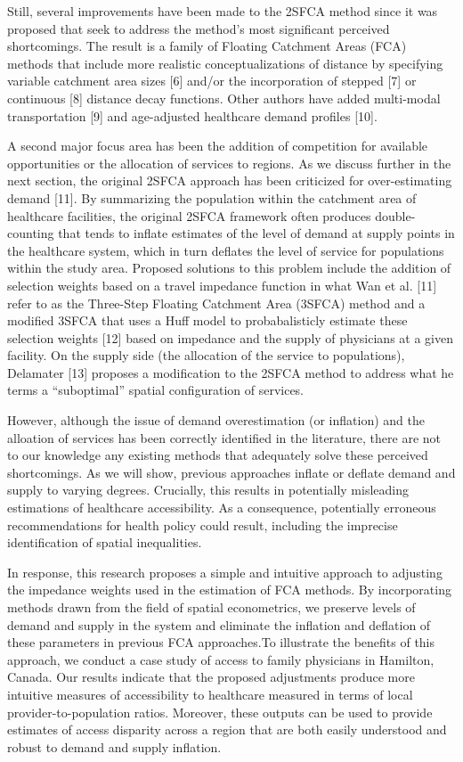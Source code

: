 \documentclass[10pt,letterpaper]{article}
\begin{document}
Still, several improvements have been made to the 2SFCA method since it
was proposed that seek to address the method's most significant
perceived shortcomings. The result is a family of Floating Catchment
Areas (FCA) methods that include more realistic conceptualizations of
distance by specifying variable catchment area sizes {[}6{]} and/or the
incorporation of stepped {[}7{]} or continuous {[}8{]} distance decay
functions. Other authors have added multi-modal transportation {[}9{]}
and age-adjusted healthcare demand profiles {[}10{]}.

A second major focus area has been the addition of competition for
available opportunities or the allocation of services to regions. As we
discuss further in the next section, the original 2SFCA approach has
been criticized for over-estimating demand {[}11{]}. By summarizing the
population within the catchment area of healthcare facilities, the
original 2SFCA framework often produces double-counting that tends to
inflate estimates of the level of demand at supply points in the
healthcare system, which in turn deflates the level of service for
populations within the study area. Proposed solutions to this problem
include the addition of selection weights based on a travel impedance
function in what Wan et al. {[}11{]} refer to as the Three-Step Floating
Catchment Area (3SFCA) method and a modified 3SFCA that uses a Huff
model to probabalisticly estimate these selection weights {[}12{]} based
on impedance and the supply of physicians at a given facility. On the
supply side (the allocation of the service to populations), Delamater
{[}13{]} proposes a modification to the 2SFCA method to address what he
terms a ``suboptimal'' spatial configuration of services.

However, although the issue of demand overestimation (or inflation) and
the alloation of services has been correctly identified in the
literature, there are not to our knowledge any existing methods that
adequately solve these perceived shortcomings. As we will show, previous
approaches inflate or deflate demand and supply to varying degrees.
Crucially, this results in potentially misleading estimations of
healthcare accessibility. As a consequence, potentially erroneous
recommendations for health policy could result, including the imprecise
identification of spatial inequalities.

In response, this research proposes a simple and intuitive approach to
adjusting the impedance weights used in the estimation of FCA methods.
By incorporating methods drawn from the field of spatial econometrics,
we preserve levels of demand and supply in the system and eliminate the
inflation and deflation of these parameters in previous FCA
approaches.To illustrate the benefits of this approach, we conduct a
case study of access to family physicians in Hamilton, Canada. Our
results indicate that the proposed adjustments produce more intuitive
measures of accessibility to healthcare measured in terms of local
provider-to-population ratios. Moreover, these outputs can be used to
provide estimates of access disparity across a region that are both
easily understood and robust to demand and supply inflation.
\end{document}
